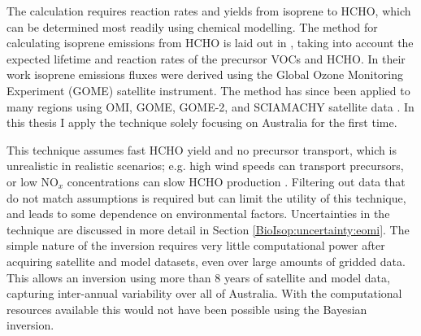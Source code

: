       The calculation requires reaction rates and yields from isoprene to HCHO, which can be determined most readily using chemical modelling.
      The method for calculating isoprene emissions from HCHO is laid out in \textcite{Palmer2003}, taking into account the expected lifetime and reaction rates of the precursor VOCs and HCHO.
      In their work isoprene emissions fluxes were derived using the Global Ozone Monitoring Experiment (GOME) satellite instrument.
      The method has since been applied to many regions using OMI, GOME, GOME-2, and SCIAMACHY satellite data \parencite[e.g.][]{Abbot2003, Barkley2013, Stavrakou2014, Surl2018}.
      In this thesis I apply the technique solely focusing on Australia for the first time.
      
      
      
      This technique assumes fast HCHO yield and no precursor transport, which is unrealistic in realistic scenarios; e.g. high wind speeds can transport precursors, or low NO$_x$ concentrations can slow HCHO production \parencite{Palmer2006,Surl2018}.
      Filtering out data that do not match assumptions is required but can limit the utility of this technique, and leads to some dependence on environmental factors.
      Uncertainties in the technique are discussed in more detail in Section \ref{BioIsop:uncertainty:eomi}.
      The simple nature of the inversion requires very little computational power after acquiring satellite and model datasets, even over large amounts of gridded data.
      This allows an inversion using more than 8 years of satellite and model data, capturing inter-annual variability over all of Australia.
      With the computational resources available this would not have been possible using the Bayesian inversion.

